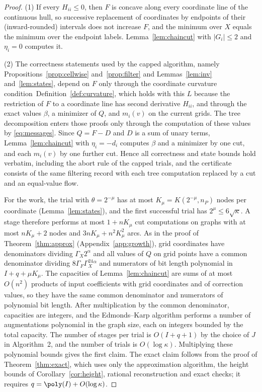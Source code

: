 \begin{proof}
(1) If every $H_{ii}\le0$, then $F$ is concave along every coordinate line of the continuous
hull, so successive replacement of coordinates by endpoints of their (inward-rounded) intervals
does not increase $F$, and the minimum over $X$ equals the minimum over the endpoint labels.
Lemma~\ref{lem:chaincut} with $|G_i|\le2$ and $\eta_i=0$ computes it.

(2) The correctness statements used by the capped algorithm, namely Propositions~\ref{prop:cellwise} and~\ref{prop:filter} and Lemmas~\ref{lem:inv}
and~\ref{lem:states}, depend on $F$ only through the coordinate curvature
condition~Definition~\ref{def:curvature}, which holds with this $L$ because the restriction of $F$ to a
coordinate line has second derivative $H_{ii}$, and through the exact values $\beta$, a
minimizer of $Q$, and $m_i(v)$ on the current grids. The tree decomposition enters those proofs
only through the computation of these values by \eqref{eq:messages}.
Since $Q=F-D$ and $D$ is a sum of unary terms, Lemma~\ref{lem:chaincut} with
$\eta_i=-d_i$ computes $\beta$ and a minimizer by one cut, and each $m_i(v)$ by one further cut.
Hence all correctness and state bounds hold verbatim, including the abort rule of the capped
trials, and the certificate consists of the same filtering record with each tree computation
replaced by a cut and an equal-value flow.

For the work, the trial with $\theta=2^{-\mu}$ has at most
$K_\mu=K(2^{-\mu},n_P)$ nodes per coordinate (Lemma~\ref{lem:states}),
and the first successful trial has $2^\mu\le6\sqrt\kappa$. A stage therefore performs at most
$1+nK_\mu$ cut computations on graphs with at most $nK_\mu+2$ nodes and
$3nK_\mu+n^2K_\mu^2$ arcs. As in the proof of Theorem~\ref{thm:approx} (Appendix~\ref{app:growth}),
grid coordinates have denominators dividing $\Gamma_X2^\alpha$ and all values of
$Q$ on grid points have a common denominator dividing
$8\Gamma_F\Gamma_X^24^\alpha$ and numerators of bit length polynomial in
$I+q+\mu K_\mu$. The capacities of Lemma~\ref{lem:chaincut} are sums of at most
$O(n^2)$ products of input coefficients with grid coordinates and of correction
values, so they
have the same common denominator and numerators of polynomial bit length. After multiplication by
the common denominator, capacities are integers, and the Edmonds--Karp algorithm performs a
number of augmentations polynomial in the graph size, each on integers bounded by the total
capacity. The number of stages per trial is $O(I+q+1)$ by the choice of $J$ in Algorithm~2, and the number
of trials is $O(\log\kappa)$. Multiplying these polynomial bounds gives the first claim. The
exact claim follows from the proof of Theorem~\ref{thm:exact}, which uses only the approximation
algorithm, the height bounds of Corollary~\ref{cor:height}, rational reconstruction and exact
checks; it requires $q=\poly(I)+O(\log\kappa)$.
\end{proof}

